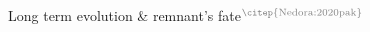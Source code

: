 \begin{frame}{Long term evolution \& remnant's fate$^\text{\textcolor{gray}{\citep{Nedora:2020pak}}}$}

\end{frame}



